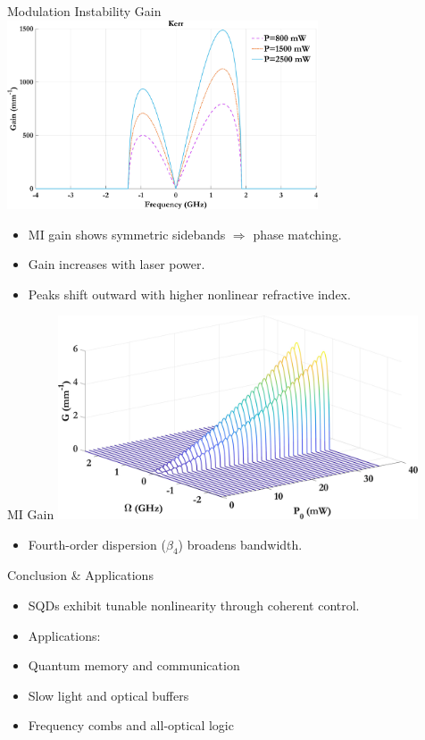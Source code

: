 \documentclass[12pt,aspectratio=1610]{beamer}
\begin{document}
\begin{frame}{Modulation Instability Gain}
  \hspace*{40pt}
  \includegraphics[width=0.69\textwidth]{Assets/G_v_Power.jpeg}
  \begin{itemize}
    \item MI gain shows symmetric sidebands $\Rightarrow$ phase matching.
    \item Gain increases with laser power.
    \item Peaks shift outward with higher nonlinear refractive index.
  \end{itemize}
\end{frame}

\begin{frame}{MI Gain}
  \vspace{-12pt}
  \hspace*{32pt}
  \includegraphics[width=0.8\textwidth]{Assets/Beta2_Kerr.jpeg}
  \begin{itemize}
    \item Fourth-order dispersion ($\beta_4$) broadens bandwidth.
  \end{itemize}
\end{frame}

\begin{frame}{Conclusion \& Applications}
  \begin{itemize}
    \item SQDs exhibit tunable nonlinearity through coherent control.
    \item Applications:
    \item Quantum memory and communication
    \item Slow light and optical buffers
    \item Frequency combs and all-optical logic
  \end{itemize}
\end{frame}
\end{document}
